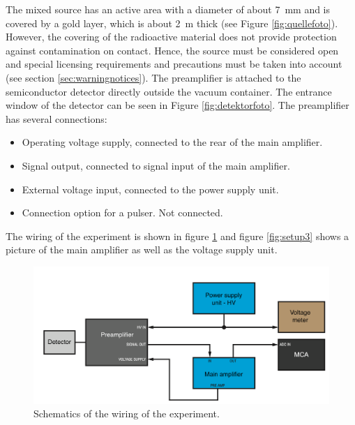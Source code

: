 \hfill

The mixed source has an active area with a diameter of about 7~mm and is covered by a gold  layer, which is about 2~\textmu m thick (see Figure \ref{fig:quellefoto}). However, the covering of the radioactive material does not provide protection against contamination on contact. Hence, the source must be considered open and special licensing requirements and precautions must be taken into account (see section \ref{sec:warningnotices}).
The preamplifier is attached to the semiconductor detector directly outside the vacuum container. The entrance window of the detector can be seen in Figure \ref{fig:detektorfoto}. The preamplifier has several connections: 
\begin{itemize}[itemsep=0pt]
	\item Operating voltage supply, connected to the rear of the main amplifier.
	\item Signal output, connected to signal input of the main amplifier.
	\item External voltage input, connected to the power supply unit.
	\item Connection option for a pulser. Not connected.
\end{itemize}
The wiring of the experiment is shown in figure \ref{fig:verkabelung} and figure \ref{fig:setup3} shows a picture of the main amplifier as well as the voltage supply unit.
\begin{figure}[h]
	\centering
	\includegraphics[width=\linewidth]{img/wiring.png}
	\caption{Schematics of the wiring of the experiment.}
	\label{fig:verkabelung}
\end{figure}


